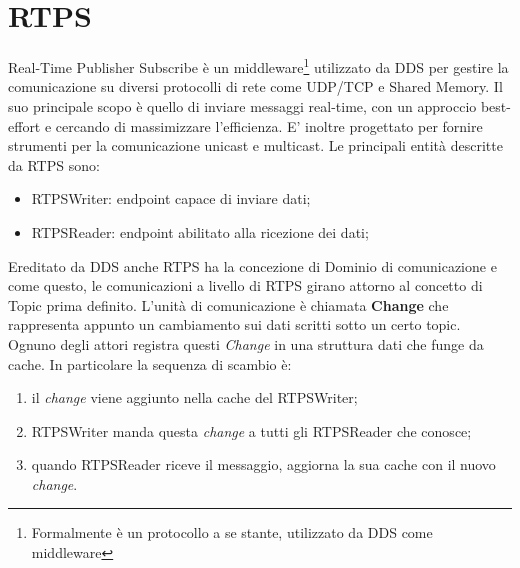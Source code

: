 \section{RTPS}\label{sec:rtps}
Real-Time Publisher Subscribe è un middleware\footnote{Formalmente è un protocollo a se stante, utilizzato da DDS come middleware} utilizzato da DDS per gestire la comunicazione su diversi protocolli di rete come UDP/TCP e Shared Memory. Il suo principale scopo è quello di inviare messaggi real-time, con un approccio best-effort e cercando di massimizzare l'efficienza. E' inoltre progettato per fornire strumenti per la comunicazione unicast e multicast. Le principali entità descritte da RTPS sono:
\begin{itemize}
    \item RTPSWriter: endpoint capace di inviare dati;
    \item RTPSReader: endpoint abilitato alla ricezione dei dati;
\end{itemize}
Ereditato da DDS anche RTPS ha la concezione di Dominio di comunicazione e come questo, le comunicazioni a livello di RTPS girano attorno al concetto di Topic prima definito. L'unità di comunicazione è chiamata \textbf{Change} che rappresenta appunto un cambiamento sui dati scritti sotto un certo topic. Ognuno degli attori registra questi \emph{Change} in una struttura dati che funge da cache.
In particolare la sequenza di scambio è:
\begin{enumerate}
    \item il \emph{change} viene aggiunto nella cache del RTPSWriter;
    \item RTPSWriter manda questa \emph{change} a tutti gli RTPSReader che conosce;
    \item quando RTPSReader riceve il messaggio, aggiorna la sua cache con il nuovo \emph{change}.
\end{enumerate}

